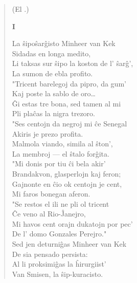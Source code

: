 \begin{verse}
\begin{center}
\footnotesize (El .)
\end{center}

\begin{center}
\textbf{I}
\end{center}

                  \vin  La \^sipo\^sar\^gisto Minheer van Kek\\
                 Sidadas en longa medito,\\
                 Li taksas sur \^sipo la koston de l' \^sar\^g',\\
                 La sumon de ebla profito. \\
                 \vin   "Tricent barelegoj da pipro, da gum'\\
                 Kaj poste la sablo de oro\dots\\
                 \^Gi estas tre bona, sed tamen al mi\\
                 Pli pla\^cas la nigra trezoro.\\
                  \vin  "Ses centojn da negroj mi \^ce Senegal\\
                 Akiris je prezo profita.\\
                 Malmola viando, simila al \^ston',\\
                 La membroj --- el \^stalo for\^gita.\\
                  \vin  "Mi donis por tiu \^ci bela akir'\\
                 Brandakvon, glasperlojn kaj feron;\\
                 Gajnonte en \^cio ok centojn je cent,\\
                 Mi faros bonegan aferon.\\
                  \vin  "Se restos el ili ne pli ol tricent\\
                 \^Ce veno al Rio-\^Janejro,\\
                 Mi havos cent orajn dukatojn por pec'\\
                 De l' domo Gonzales Perejro."\\
                 \vin   Sed jen deturni\^gas Minheer van Kek\\
                 De sia pensado persista:\\
                 Al li proksimi\^gas la \^hirurgiist'\\
                 Van Smisen, la \^sip-kuracisto.\\

\end{verse}
